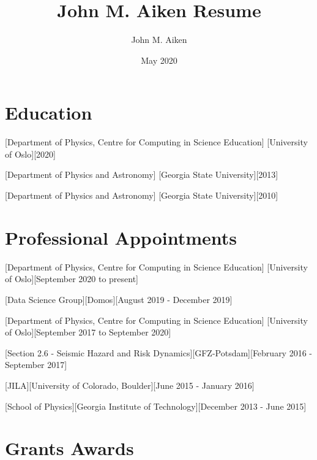 \documentclass{article}
\title{John M. Aiken Resume}
\author{John M. Aiken}
\date{May 2020}
\begin{document}

\makecvtitle %

\section{Education}

[Department of Physics, Centre for Computing in Science Education]
[University of Oslo][2020]

[Department of Physics and Astronomy]
[Georgia State University][2013]

[Department of Physics and Astronomy]
[Georgia State University][2010]

\section{Professional Appointments}

[Department of Physics, Centre for Computing in Science Education]
[University of Oslo][September 2020 to present]

[Data Science Group][Domos][August 2019 - December 2019]

[Department of Physics, Centre for Computing in Science Education]
[University of Oslo][September 2017 to September 2020]

[Section 2.6 - Seismic Hazard and Risk Dynamics][GFZ-Potsdam][February 2016 - September 2017]

[JILA][University of Colorado, Boulder][June 2015 - January 2016]


[School of Physics][Georgia Institute of Technology][December 2013 - June 2015]

\section{Grants Awards}
\end{document}

